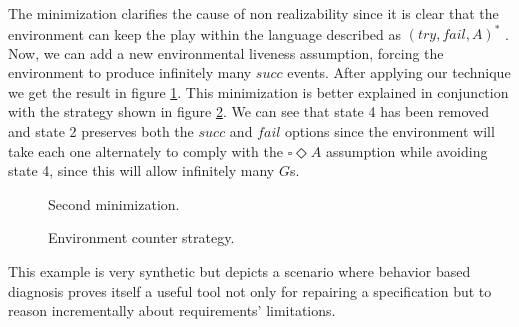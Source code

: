 The minimization clarifies the cause of non realizability
since it is clear that the environment can keep the play
within the language described as $(try, fail, A)^*$ .\\
Now, we can add a new environmental liveness assumption,
forcing the environment to produce infinitely many $succ$
events.  After applying our technique we get the result in
figure \ref{fig:strongfairness-min2}.  This minimization is 
better explained in conjunction with the strategy shown in 
figure \ref{fig:strongfairness-min-counter-strat}. We can see
that state 4 has been removed and state 2 preserves both
the $succ$ and $fail$ options since the environment will take
each one alternately to comply with the $\square \Diamond A$
assumption while avoiding state 4, since this will allow 
infinitely many $G$s.
\begin{figure}[bt]
\centering
\SmallPicture
{}
\vspace*{-2mm}
\caption{Second minimization.}
\label{fig:strongfairness-min2}
\vspace*{-4mm}
\MediumPicture
\end{figure}
\begin{figure}[bt]
\centering
\SmallPicture
{}
\vspace*{-2mm}
\caption{Environment counter strategy.}
\label{fig:strongfairness-min-counter-strat}
\vspace*{-4mm}
\MediumPicture
\end{figure}
This example is very synthetic but depicts a scenario
where behavior based diagnosis proves itself a useful
tool not only for repairing a specification but to reason 
incrementally about requirements' limitations.
